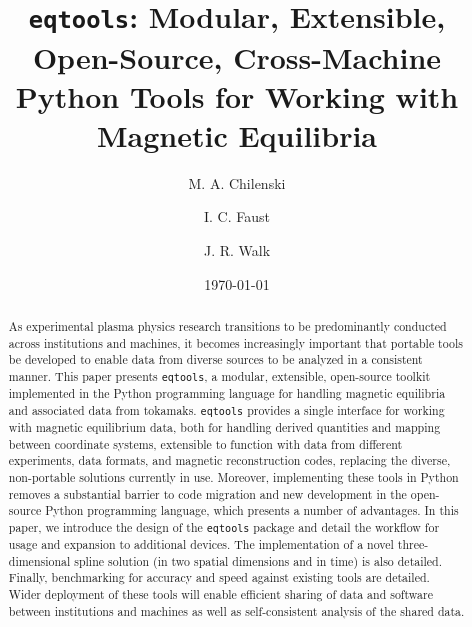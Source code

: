 \documentclass[12pt,floatfix,showpacs]{revtex4-1}
\newcommand{\gnote}[1]{\marginpar{\scriptsize\textcolor{red}{#1}}}
\newcommand{\eqtools}{\texttt{eqtools}\xspace}
\begin{document}
\title{\eqtools: Modular, Extensible, Open-Source, Cross-Machine Python Tools for Working with Magnetic Equilibria}

\author{M. A. Chilenski}

\author{I. C. Faust}

\author{J. R. Walk}

\date{\today}

\begin{abstract}
As experimental plasma physics research transitions to be predominantly conducted across institutions and machines, it becomes increasingly important that portable tools be developed to enable data from diverse sources to be analyzed in a consistent manner. 
This paper presents \eqtools, a modular, extensible, open-source toolkit implemented in the Python programming language for handling magnetic equilibria and associated data from tokamaks. 
\eqtools provides a single interface for working with magnetic equilibrium data, both for handling derived quantities and mapping between coordinate systems, extensible to function with data from different experiments, data formats, and magnetic reconstruction codes, replacing the diverse, non-portable solutions currently in use.  
Moreover, implementing these tools in Python removes a substantial barrier to code migration and new development in the open-source Python programming language, which presents a number of advantages.  
In this paper, we introduce the design of the \eqtools package and detail the workflow for usage and expansion to additional devices.  The implementation of a novel three-dimensional spline solution (in two spatial dimensions and in time) is also detailed.  
Finally, benchmarking for accuracy and speed against existing tools are detailed. Wider deployment of these tools will enable efficient sharing of data and software between institutions and machines as well as self-consistent analysis of the shared data.
\end{abstract}
\gnote{other PACs numbers?}


\maketitle

\end{document}

